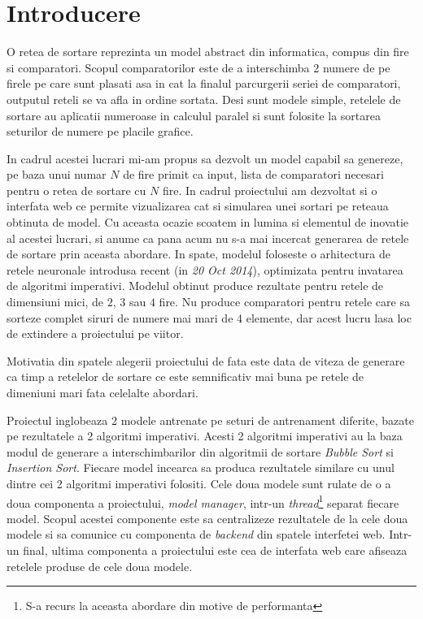 \documentclass[12pt]{article}
\begin{document}
\vspace{80mm}

\pagebreak

\section{Introducere}

O retea de sortare reprezinta un model abstract din informatica, compus din fire si comparatori. Scopul comparatorilor este de a interschimba 2 numere de pe firele pe care sunt plasati asa in cat la finalul parcurgerii seriei de comparatori, outputul reteli se va afla in ordine sortata. Desi sunt modele simple, retelele de sortare au aplicatii numeroase in calculul paralel si sunt folosite la sortarea seturilor de numere pe placile grafice.
 
   In cadrul acestei lucrari mi-am propus sa dezvolt un model capabil sa genereze, pe baza unui numar $N$ de fire primit ca input, lista de comparatori necesari pentru o retea de sortare cu $N$ fire. In cadrul proiectului am dezvoltat si o interfata web ce permite vizualizarea cat si simularea unei sortari pe reteaua obtinuta de model. Cu aceasta ocazie scoatem in lumina si elementul de inovatie al acestei lucrari, si anume ca pana acum nu s-a mai incercat generarea de retele de sortare prin aceasta abordare. In spate, modelul foloseste o arhitectura de retele neuronale introdusa recent (in \textit{20 Oct 2014}), optimizata pentru invatarea de algoritmi imperativi. Modelul obtinut produce rezultate pentru retele de dimensiuni mici, de $2$, $3$ sau $4$ fire. Nu produce comparatori pentru retele care sa sorteze complet siruri de numere mai mari de $4$ elemente, dar acest lucru lasa loc de extindere a proiectului pe viitor.

Motivatia din spatele alegerii proiectului de fata este data de viteza de generare ca timp a retelelor de sortare ce este semnificativ mai buna pe retele de dimeniuni mari fata celelalte abordari.

Proiectul inglobeaza 2 modele antrenate pe seturi de antrenament diferite, bazate pe rezultatele a 2 algoritmi imperativi. Acesti 2 algoritmi imperativi au la baza modul de generare a interschimbarilor din algoritmii de sortare \textit{Bubble Sort} si \textit{Insertion Sort}. Fiecare model incearca sa produca rezultatele similare cu unul dintre cei 2 algoritmi imperativi folositi. Cele doua modele sunt rulate de o a doua componenta a proiectului, \textit{model manager}, intr-un \textit{thread}\footnote{S-a recurs la aceasta abordare din motive de performanta} separat fiecare model. Scopul acestei componente este sa centralizeze rezultatele de la cele doua modele si sa comunice cu componenta de \textit{backend} din spatele interfetei web. Intr-un final, ultima componenta a proiectului este cea de interfata web care afiseaza retelele produse de cele doua modele.
\end{document}
